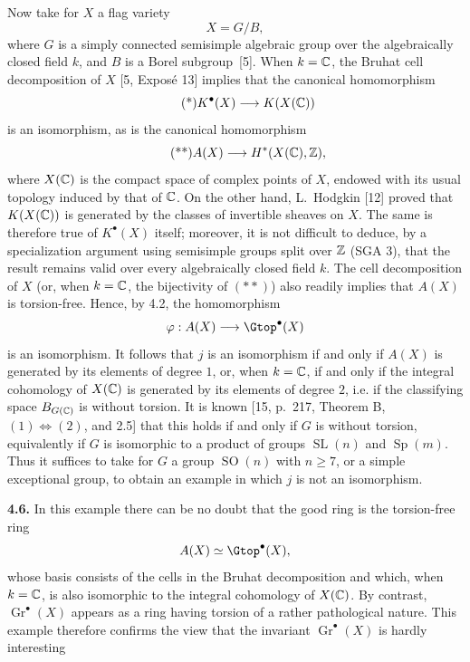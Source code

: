 Now take for $X$ a flag variety
\[
 X=G/B,
\]
where $G$ is a simply connected semisimple algebraic group over the
algebraically closed field $k$, and $B$ is a Borel subgroup~[5]. When
$k=\mathbb C$, the Bruhat cell decomposition of $X$ [5, Exposé 13] implies that
the canonical homomorphism
\begin{equation*}\tag{*}
 K^\bullet(X)\longrightarrow K(X(\mathbb C))
\end{equation*}
is an isomorphism, as is the canonical homomorphism
\begin{equation*}\tag{**}
 A(X)\longrightarrow H^*(X(\mathbb C),\mathbb Z),
\end{equation*}
where $X(\mathbb C)$ is the compact space of complex points of $X$, endowed with
its usual topology induced by that of $\mathbb C$. On the other hand, L.~Hodgkin
[12] proved that $K(X(\mathbb C))$ is generated by the classes of invertible
sheaves on $X$. The same is therefore true of $K^\bullet(X)$ itself;
moreover, it is not difficult to deduce, by a specialization argument using
semisimple groups split over $\mathbb Z$ (SGA 3), that the result remains valid
over every algebraically closed field $k$. The cell decomposition of $X$
(or, when $k=\mathbb C$, the bijectivity of $(**)$) also readily implies that
$A(X)$ is torsion-free. Hence, by 4.2, the homomorphism
\[
 \varphi:A(X)\longrightarrow\Gtop^\bullet(X)
\]
is an isomorphism. It follows that $j$ is an isomorphism if and only if
$A(X)$ is generated by its elements of degree $1$, or, when $k=\mathbb C$, if and
only if the integral cohomology of $X(\mathbb C)$ is generated by its elements of
degree $2$, i.e. if the classifying space $B_{G(\mathbb C)}$ is without torsion. It
is known [15, p.~217, Theorem B, $(1)\Leftrightarrow(2)$, and 2.5] that this
holds if and only if $G$ is without torsion, equivalently if $G$ is
isomorphic to a product of groups $\operatorname{SL}(n)$ and
$\operatorname{Sp}(m)$. Thus it suffices to take for $G$ a group
$\operatorname{SO}(n)$ with $n\geq7$, or a simple exceptional group, to
obtain an example in which $j$ is not an isomorphism.

\noindent\textbf{4.6.}
In this example there can be no doubt that the good ring is the torsion-free
ring
\[
 A(X)\simeq\Gtop^\bullet(X),
\]
whose basis consists of the cells in the Bruhat decomposition and which,
when $k=\mathbb C$, is also isomorphic to the integral cohomology of $X(\mathbb C)$. By
contrast, $\operatorname{Gr}^\bullet(X)$ appears as a ring having torsion
of a rather pathological nature. This example therefore confirms the view
that the invariant $\operatorname{Gr}^\bullet(X)$ is hardly interesting

